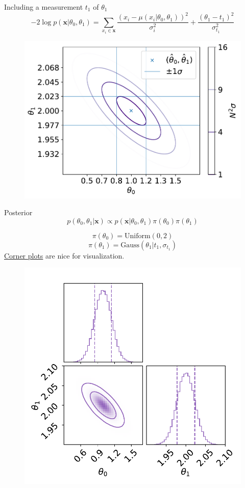 \documentclass[
aspectratio=169,
14pt,
professionalfonts
]{beamer}
\begin{document}
\begin{frame}{Including a measurement $t_1$ of $\theta_1$}
\vspace{-1cm}
    $$ -2\log p(\mathbf{x}|\theta_0, \theta_1) = \sum_{x_i \in \mathbf{x}}\frac{\left(x_i -\mu(x_i|\theta_0, \theta_1)\right)^2}{\sigma_i^2} + \frac{\left(\theta_1 -t_1\right)^2}{\sigma_{t_1}^2} $$
    \begin{figure}
        \centering
        \includegraphics[width=0.5\linewidth]{../plots/nll_constr.pdf}
    \end{figure}
\end{frame}

\begin{frame}{Posterior}
\vspace{-1cm}
    $$p(\theta_0, \theta_1|\mathbf{x}) \propto p(\mathbf{x}|\theta_0, \theta_1) \pi(\theta_0)\pi(\theta_1)$$
    \begin{minipage}{0.49\linewidth}
        $$\pi(\theta_0) = \text{Uniform}(0,2)$$
        $$\pi(\theta_1) = \text{Gauss}(\theta_1 | t_1, \sigma_{t_1})$$
        \href{https://corner.readthedocs.io/en/latest/}{Corner plots} are nice for visualization.
    \end{minipage}
    \begin{minipage}{0.49\linewidth}
    \begin{figure}
        \centering
        \includegraphics[width=0.9\linewidth]{../plots/posterior.pdf}
    \end{figure}
    \end{minipage}
\end{frame}
\end{document}
